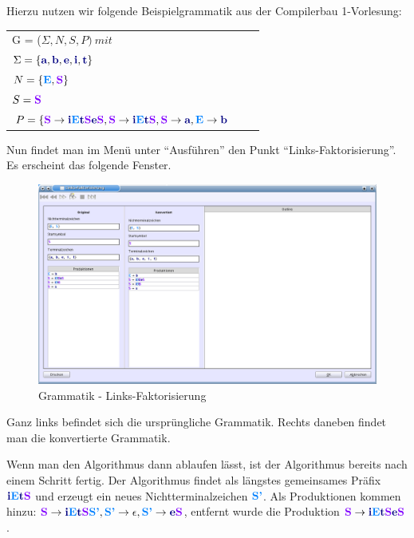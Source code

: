Hierzu nutzen wir folgende Beispielgrammatik aus der Compilerbau 1-Vorlesung:

\begin{tabular}{lcr}
G = ($\Sigma, N, S, P )\ mit $\\
$\Sigma = \{\TerminalSymbol{a}, \TerminalSymbol{b}, \TerminalSymbol{e},
\TerminalSymbol{i},\TerminalSymbol{t}\}$\\ $N =
\{\NonterminalSymbol{E}, \StartSymbol{S}\}$\\ $S=\StartSymbol{S}$\\
$P = \{\StartSymbol{S} \to \TerminalSymbol{i}\NonterminalSymbol{E}\TerminalSymbol{t}\StartSymbol{S}\TerminalSymbol{e}\StartSymbol{S},\StartSymbol{S} \to \TerminalSymbol{i}\NonterminalSymbol{E}\TerminalSymbol{t}\StartSymbol{S}, \StartSymbol{S} \to \TerminalSymbol{a}, \NonterminalSymbol{E} \to \TerminalSymbol{b}$\\
\end{tabular}

Nun findet man im Menü unter "`Ausführen"' den Punkt "`Links-Faktorisierung"'. Es erscheint das folgende Fenster.

\begin{figure}[h]
\begin{center}
\includegraphics[width=12cm]{../images/left_factoring.png}
\caption{Grammatik - Links-Faktorisierung}
\end{center}
\end{figure}

Ganz links befindet sich die ursprüngliche Grammatik. Rechts daneben findet man die konvertierte Grammatik.

Wenn man den Algorithmus dann ablaufen lässt, ist der Algorithmus bereits nach einem Schritt fertig. Der Algorithmus findet als längstes gemeinsames Präfix $\TerminalSymbol{i}\NonterminalSymbol{E}\TerminalSymbol{t}\StartSymbol{S}$ und erzeugt ein neues Nichtterminalzeichen $\NonterminalSymbol{S'}$. Als Produktionen kommen hinzu: $\StartSymbol{S} \to \TerminalSymbol{i}\NonterminalSymbol{E}\TerminalSymbol{t}\StartSymbol{S}\NonterminalSymbol{S'}, \NonterminalSymbol{S'} \to \epsilon, \NonterminalSymbol{S'} \to \TerminalSymbol{e}\StartSymbol{S}$, entfernt wurde die Produktion $\StartSymbol{S} \to \TerminalSymbol{i}\NonterminalSymbol{E}\TerminalSymbol{t}\StartSymbol{S}\TerminalSymbol{e}\StartSymbol{S}$.

